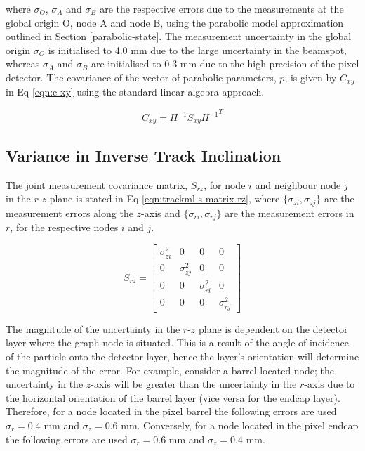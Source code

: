 where $\sigma_O$, $\sigma_A$ and $\sigma_B$ are the respective errors due to the measurements at the global origin O, node A and node B, using the parabolic model approximation outlined in Section \ref{parabolic-state}. The measurement uncertainty in the global origin $\sigma_O$ is initialised to 4.0 mm due to the large uncertainty in the beamspot, whereas $\sigma_A$ and $\sigma_B$ are initialised to 0.3 mm due to the high precision of the pixel detector. The covariance of the vector of parabolic parameters, $p$, is given by $C_{xy}$ in Eq \eqref{eqn:c-xy} using the standard linear algebra approach.

\begin{equation}
    C_{xy} = H^{-1}S_{xy}{H^{-1}}^{T}
    \label{eqn:c-xy}
\end{equation}






\subsection{Variance in Inverse Track Inclination}
\label{variance-in-inverse-track-inclination}

The joint measurement covariance matrix, $S_{rz}$, for node $i$ and neighbour node $j$ in the $r$-$z$ plane is stated in Eq \eqref{eqn:trackml-s-matrix-rz}, where $\{ \sigma_{zi}, \sigma_{zj} \}$ are the measurement errors along the $z$-axis and $\{ \sigma_{ri}, \sigma_{rj} \}$ are the measurement errors in $r$, for the respective nodes $i$ and $j$. 

\begin{equation}
    S_{rz} = \begin{bmatrix} \sigma_{zi}^{2} & 0 & 0 & 0 \\ 
                             0 & \sigma_{zj}^{2} & 0 & 0 \\ 
                             0 & 0 & \sigma_{ri}^{2} & 0 \\
                             0 & 0 & 0 & \sigma_{rj}^{2}
                            \end{bmatrix} 
    \label{eqn:trackml-s-matrix-rz}
\end{equation}


The magnitude of the uncertainty in the $r$-$z$ plane is dependent on the detector layer where the graph node is situated. This is a result of the angle of incidence of the particle onto the detector layer, hence the layer's orientation will determine the magnitude of the error. For example, consider a barrel-located node; the uncertainty in the $z$-axis will be greater than the uncertainty in the $r$-axis due to the horizontal orientation of the barrel layer (vice versa for the endcap layer). Therefore, for a node located in the pixel barrel the following errors are used $\sigma_r = 0.4$ mm and $\sigma_z = 0.6$ mm. Conversely, for a node located in the pixel endcap the following errors are used $\sigma_r = 0.6$ mm and $\sigma_z = 0.4$ mm.

